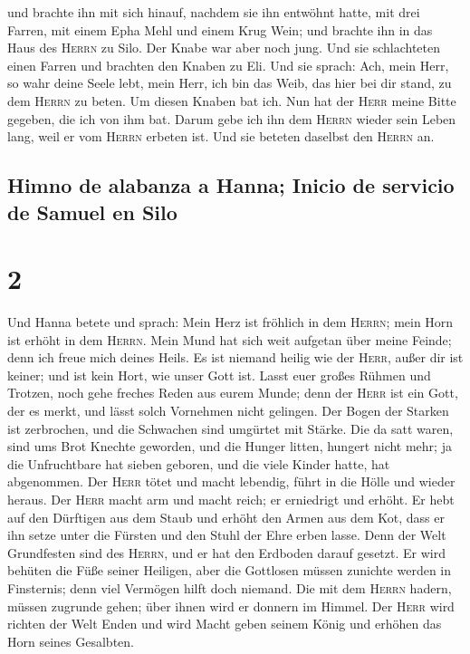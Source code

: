  und brachte ihn mit sich hinauf, nachdem sie ihn
entwöhnt hatte, mit drei Farren, mit einem Epha Mehl und einem Krug
Wein; und brachte ihn in das Haus des \textsc{Herrn} zu Silo. Der Knabe
war aber noch jung.  Und sie schlachteten einen Farren
und brachten den Knaben zu Eli.  Und sie sprach: Ach,
mein Herr, so wahr deine Seele lebt, mein Herr, ich bin das Weib, das
hier bei dir stand, zu dem \textsc{Herrn} zu beten.  Um
diesen Knaben bat ich. Nun hat der \textsc{Herr} meine Bitte gegeben,
die ich von ihm bat.  Darum gebe ich ihn dem
\textsc{Herrn} wieder sein Leben lang, weil er vom \textsc{Herrn}
erbeten ist. Und sie beteten daselbst den \textsc{Herrn} an.

\hypertarget{himno-de-alabanza-a-hanna-inicio-de-servicio-de-samuel-en-silo}{%
\subsection{Himno de alabanza a Hanna; Inicio de servicio de Samuel en
Silo}\label{himno-de-alabanza-a-hanna-inicio-de-servicio-de-samuel-en-silo}}

\hypertarget{section-1}{%
\section{2}\label{section-1}}

 Und Hanna betete und sprach: Mein Herz ist fröhlich in
dem \textsc{Herrn}; mein Horn ist erhöht in dem \textsc{Herrn}. Mein
Mund hat sich weit aufgetan über meine Feinde; denn ich freue mich
deines Heils.  Es ist niemand heilig wie der
\textsc{Herr}, außer dir ist keiner; und ist kein Hort, wie unser Gott
ist.  Lasst euer großes Rühmen und Trotzen, noch gehe
freches Reden aus eurem Munde; denn der \textsc{Herr} ist ein Gott, der
es merkt, und lässt solch Vornehmen nicht gelingen.  Der
Bogen der Starken ist zerbrochen, und die Schwachen sind umgürtet mit
Stärke.  Die da satt waren, sind ums Brot Knechte
geworden, und die Hunger litten, hungert nicht mehr; ja die Unfruchtbare
hat sieben geboren, und die viele Kinder hatte, hat abgenommen.
 Der \textsc{Herr} tötet und macht lebendig, führt in die
Hölle und wieder heraus.  Der \textsc{Herr} macht arm und
macht reich; er erniedrigt und erhöht.  Er hebt auf den
Dürftigen aus dem Staub und erhöht den Armen aus dem Kot, dass er ihn
setze unter die Fürsten und den Stuhl der Ehre erben lasse. Denn der
Welt Grundfesten sind des \textsc{Herrn}, und er hat den Erdboden darauf
gesetzt.  Er wird behüten die Füße seiner Heiligen, aber
die Gottlosen müssen zunichte werden in Finsternis; denn viel Vermögen
hilft doch niemand.  Die mit dem \textsc{Herrn} hadern,
müssen zugrunde gehen; über ihnen wird er donnern im Himmel. Der
\textsc{Herr} wird richten der Welt Enden und wird Macht geben seinem
König und erhöhen das Horn seines Gesalbten.

